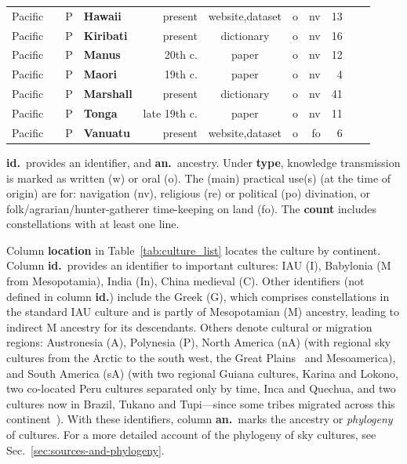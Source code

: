 \documentclass[10pt]{article}
\begin{document}
\begin{table}[htbp]
{{\begin{tabular}{rcclrcrrrrr}
Pacific		& 	& P	& \textbf{Hawaii}		& present		& website,dataset& o& nv	& 13	& \cite{HSL,Stellarium} \\
Pacific		& 	& P	& \textbf{Kiribati}	& present		& dictionary& o	& nv	& 16	& \cite{KED} \\
Pacific		& 	& P	& \textbf{Manus}		& 20th c.		& paper			& o	& nv	& 12	& \cite{hoeppe2000shark} \\
Pacific		& 	& P	& \textbf{Maori}		& 19th c.		& paper			& o	& nv	& 4		& \cite{orchiston2000polynesian,Stellarium} \\
Pacific		& 	& P	& \textbf{Marshall}	& present		& dictionary& o	& nv	& 41	& \cite{MEOO} \\
Pacific		& 	& P	& \textbf{Tonga}		& late 19th c.	& paper	& o	& nv	& 11	& \cite{collocott1922tongan,Stellarium} \\
Pacific		& 	& P	& \textbf{Vanuatu}	& present		& website,dataset& o& fo	& 6		& \cite{DMR,Stellarium} \\
\hline
%
\end{tabular}
}
}
\medskip
\begin{flushleft}
{\footnotesize {\bf id.}\ provides an identifier, and {\bf an.}\ ancestry. Under {\bf type}, knowledge transmission is marked as written (w) or oral (o). The (main) practical use(s) (at the time of origin) are for: navigation (nv), religious (re) or political (po) divination, or folk/agrarian/hunter-gatherer time-keeping on land (fo). The {\bf count} includes constellations with at least one line.}
\end{flushleft}
\end{table}

Column {\bf location} in Table~\ref{tab:culture_list} locates the culture by continent. Column {\bf id.}\ provides an identifier to important cultures: IAU (I), Babylonia (M from Mesopotamia), India (In), China medieval (C). Other identifiers (not defined in column {\bf id.}) include the Greek (G), which comprises constellations in the standard IAU culture and is partly of Mesopotamian (M) ancestry, leading to indirect M ancestry for its descendants. Others denote cultural or migration regions: Austronesia (A), Polynesia (P), North America (nA) (with regional sky cultures from the Arctic to the south west, the Great Plains~\cite{miller1997stars} and Mesoamerica), and South America (sA) (with two regional Guiana cultures, Kari{\textquotesingle}na and Lokono, two co-located Peru cultures separated only by time, Inca and Quechua, and two cultures now in Brazil, Tukano and Tupi---since some tribes migrated across this continent~\cite{magana1984tupi}). With these identifiers, column {\bf an.}\ marks the ancestry or \emph{phylogeny} of cultures. For a more detailed account of the phylogeny of sky cultures, see Sec.~\ref{sec:sources-and-phylogeny}.
\end{document}
